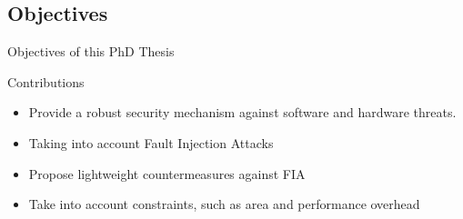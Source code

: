 \subsection{Objectives}
\begin{frame}{Objectives of this PhD Thesis}
    \begin{block}{Contributions}
        \begin{itemize}
            [triangle]
            \justifying
            \item Provide a robust security mechanism against software and hardware threats.
            \item Taking into account Fault Injection Attacks
            \item Propose lightweight countermeasures against FIA
            \item Take into account constraints, such as area and performance overhead
        \end{itemize}
    \end{block}
\end{frame}
